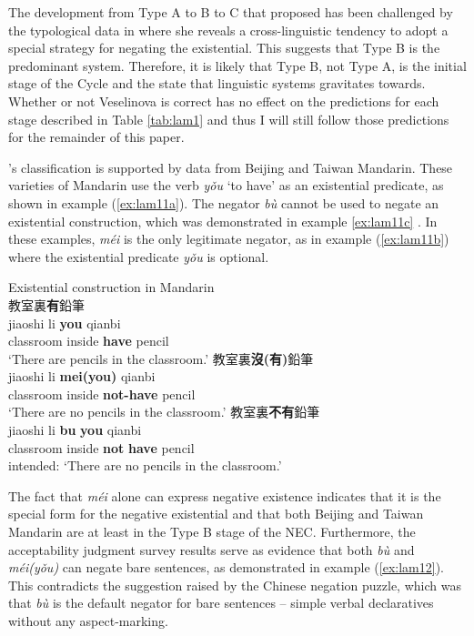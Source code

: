 \documentclass[output=paper]{langscibook}
\begin{document}
The development from Type A to B to C that \cite{Croft1991} proposed has been challenged by the typological data in \cite{Veselinova2016} where she reveals a cross-linguistic tendency to adopt a special strategy for negating the existential. This suggests that Type B is the predominant system. Therefore, it is likely that Type B, not Type A, is the initial stage of the Cycle and the state that linguistic systems gravitates towards. Whether or not Veselinova is correct has no effect on the predictions for each stage described in Table \ref{tab:lam1} and thus I will still follow those predictions for the remainder of this paper.

\citeauthor{Croft1991}'s classification is supported by data from Beijing and Taiwan Mandarin. These varieties of Mandarin use the verb \textit{yǒu} `to have' as an existential predicate, as shown in example (\ref{ex:lam11a}). The negator \textit{bù} cannot be used to negate an existential construction, which was demonstrated in example \ref{ex:lam11c} .
In these examples, \textit{méi} is the only legitimate negator, as in example (\ref{ex:lam11b}) where the existential predicate \textit{yǒu} is optional.\footnotemark


\ea Existential construction in Mandarin \label{ex:lam11}\\
  \ea 教室裏\textbf{有}鉛筆 \label{ex:lam11a}\\
  	\gll jiaoshi	 li	\textbf{you} qianbi\\ 
  	classroom	inside	\textbf{have}	pencil\\
  	\glt `There are pencils in the classroom.'
  \ex 教室裏\textbf{沒(有)}鉛筆 \label{ex:lam11b}\\
  	\gll jiaoshi	 li \textbf{mei(you)} qianbi\\
  	classroom inside \textbf{not-have} pencil\\
  	\glt `There are no pencils in the classroom.'
  \ex 教室裏\textbf{不有}鉛筆 \label{ex:lam11c}\\
  	\gll *jiaoshi li \textbf{bu} \textbf{you} qianbi\\		
  	classroom	inside	\textbf{not} \textbf{have}	pencil\\
  	\glt intended: `There are no pencils in the classroom.'
\z \z 


The fact that \textit{méi} alone can express negative existence indicates that it is the special form for the negative existential and that both Beijing and Taiwan Mandarin are at least in the Type B stage of the NEC. Furthermore, the acceptability judgment survey results serve as evidence that both \textit{bù} and \textit{méi(yǒu)} can negate bare sentences, as demonstrated in example (\ref{ex:lam12}). This contradicts the suggestion raised by the Chinese negation puzzle, which was that \textit{bù} is the default negator for bare sentences – simple verbal declaratives without any aspect-marking.
\end{document}
